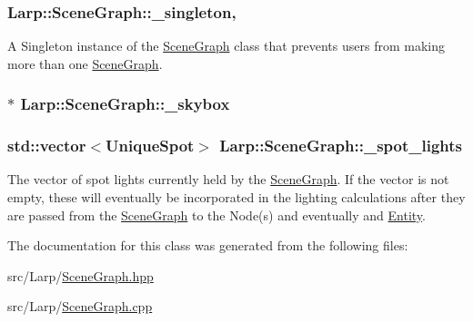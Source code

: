 \subsubsection[{\texorpdfstring{\+\_\+singleton}{_singleton}}]{ Larp\+::\+Scene\+Graph\+::\+\_\+singleton\hspace{0.3cm}{\ttfamily [static]}, {\ttfamily [private]}}\hypertarget{classLarp_1_1SceneGraph_a93181088bdc8610fb5d56904b588426f}{}\label{classLarp_1_1SceneGraph_a93181088bdc8610fb5d56904b588426f}
A Singleton instance of the \hyperlink{classLarp_1_1SceneGraph}{Scene\+Graph} class that prevents users from making more than one \hyperlink{classLarp_1_1SceneGraph}{Scene\+Graph}. 
\subsubsection[{\texorpdfstring{\+\_\+skybox}{_skybox}}]{$\ast$ Larp\+::\+Scene\+Graph\+::\+\_\+skybox\hspace{0.3cm}{\ttfamily [private]}}\hypertarget{classLarp_1_1SceneGraph_a5821f205cc6238c6855a08e1016ac768}{}\label{classLarp_1_1SceneGraph_a5821f205cc6238c6855a08e1016ac768}
\subsubsection[{\texorpdfstring{\+\_\+spot\+\_\+lights}{_spot_lights}}]{\setlength{\rightskip}{0pt plus 5cm}std\+::vector$<${\bf Unique\+Spot}$>$ Larp\+::\+Scene\+Graph\+::\+\_\+spot\+\_\+lights\hspace{0.3cm}{\ttfamily [private]}}\hypertarget{classLarp_1_1SceneGraph_a7abcb3d4cfaa7b4d92d30cbbeeeb275f}{}\label{classLarp_1_1SceneGraph_a7abcb3d4cfaa7b4d92d30cbbeeeb275f}
The vector of spot lights currently held by the \hyperlink{classLarp_1_1SceneGraph}{Scene\+Graph}. If the vector is not empty, these will eventually be incorporated in the lighting calculations after they are passed from the \hyperlink{classLarp_1_1SceneGraph}{Scene\+Graph} to the Node(s) and eventually and \hyperlink{classLarp_1_1Entity}{Entity}. 

The documentation for this class was generated from the following files\+:\begin{DoxyCompactItemize}
\item 
src/\+Larp/\hyperlink{SceneGraph_8hpp}{Scene\+Graph.\+hpp}\item 
src/\+Larp/\hyperlink{SceneGraph_8cpp}{Scene\+Graph.\+cpp}\end{DoxyCompactItemize}
